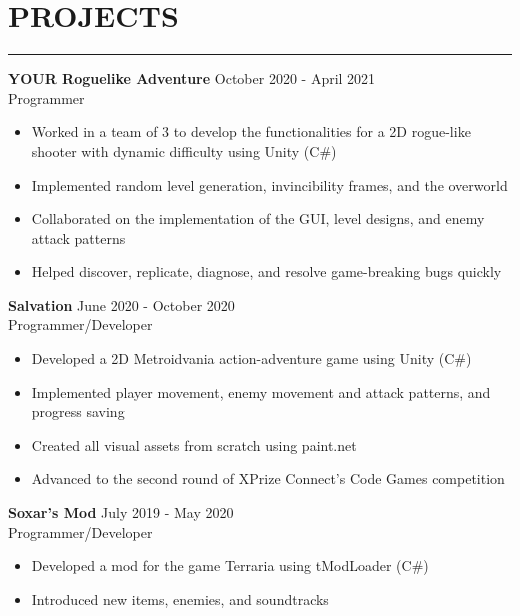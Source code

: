 \documentclass{article}
\begin{document}
\section*{PROJECTS} \vspace{-6pt} \hrule \vspace{6pt}
\textbf{YOUR Roguelike Adventure} \hfill October 2020 - April 2021\\
Programmer
\begin{itemize}
	\item\vspace{-6pt} Worked in a team of 3 to develop the functionalities for a 2D rogue-like shooter with dynamic difficulty using Unity (C$\#$)
	\item\vspace{-6pt} Implemented random level generation, invincibility frames, and the overworld
	\item\vspace{-6pt} Collaborated on the implementation of the GUI, level designs, and enemy attack patterns
	\item\vspace{-6pt} Helped discover, replicate, diagnose, and resolve game-breaking bugs quickly
\end{itemize}
\vspace{-6pt}
\textbf{Salvation} \hfill June 2020 - October 2020\\
Programmer/Developer
\begin{itemize}
	\item\vspace{-6pt} Developed a 2D Metroidvania action-adventure game using Unity (C$\#$)
	\item\vspace{-6pt} Implemented player movement, enemy movement and attack patterns, and progress saving
	\item\vspace{-6pt} Created all visual assets from scratch using paint.net
	\item\vspace{-6pt} Advanced to the second round of XPrize Connect's Code Games competition

\end{itemize}
\vspace{-6pt}
\textbf{Soxar's Mod} \hfill July 2019 - May 2020\\
Programmer/Developer
\begin{itemize}
	\item\vspace{-6pt} Developed a mod for the game Terraria using tModLoader (C$\#$)
	\item\vspace{-6pt} Introduced new items, enemies, and soundtracks
\end{itemize}
\vspace{-20pt}
\end{document}

